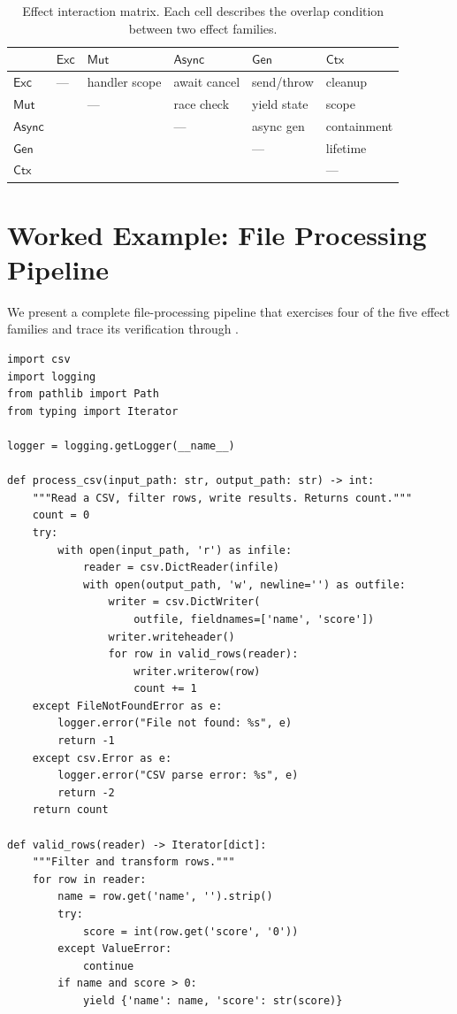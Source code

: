 \documentclass[11pt]{article}
\newcommand{\Exc}{\mathsf{Exc}}          %
\newcommand{\Mut}{\mathsf{Mut}}          %
\newcommand{\Async}{\mathsf{Async}}      %
\newcommand{\Gen}{\mathsf{Gen}}          %
\newcommand{\Ctx}{\mathsf{Ctx}}          %
\begin{document}
\begin{table}[H]
\centering
\caption{Effect interaction matrix.  Each cell describes the overlap
  condition between two effect families.}\label{tab:interactions}
\small
\begin{tabular}{@{}l l l l l l@{}}
\toprule
 & $\Exc$ & $\Mut$ & $\Async$ & $\Gen$ & $\Ctx$ \\
\midrule
$\Exc$   & --- & handler scope & await cancel & send/throw & cleanup \\
$\Mut$   &     & ---           & race check   & yield state & scope \\
$\Async$ &     &               & ---           & async gen  & containment \\
$\Gen$   &     &               &               & ---        & lifetime \\
$\Ctx$   &     &               &               &            & --- \\
\bottomrule
\end{tabular}
\end{table}

\section{Worked Example: File Processing Pipeline}\label{sec:file-example}

We present a complete file-processing pipeline that exercises four of
the five effect families and trace its verification through \JuGeo{}.

\begin{lstlisting}[style=jugeo-python,caption={File processing pipeline with multiple effects.}]
import csv
import logging
from pathlib import Path
from typing import Iterator

logger = logging.getLogger(__name__)

def process_csv(input_path: str, output_path: str) -> int:
    """Read a CSV, filter rows, write results. Returns count."""
    count = 0
    try:
        with open(input_path, 'r') as infile:
            reader = csv.DictReader(infile)
            with open(output_path, 'w', newline='') as outfile:
                writer = csv.DictWriter(
                    outfile, fieldnames=['name', 'score'])
                writer.writeheader()
                for row in valid_rows(reader):
                    writer.writerow(row)
                    count += 1
    except FileNotFoundError as e:
        logger.error("File not found: %s", e)
        return -1
    except csv.Error as e:
        logger.error("CSV parse error: %s", e)
        return -2
    return count

def valid_rows(reader) -> Iterator[dict]:
    """Filter and transform rows."""
    for row in reader:
        name = row.get('name', '').strip()
        try:
            score = int(row.get('score', '0'))
        except ValueError:
            continue
        if name and score > 0:
            yield {'name': name, 'score': str(score)}
\end{lstlisting}
\end{document}
